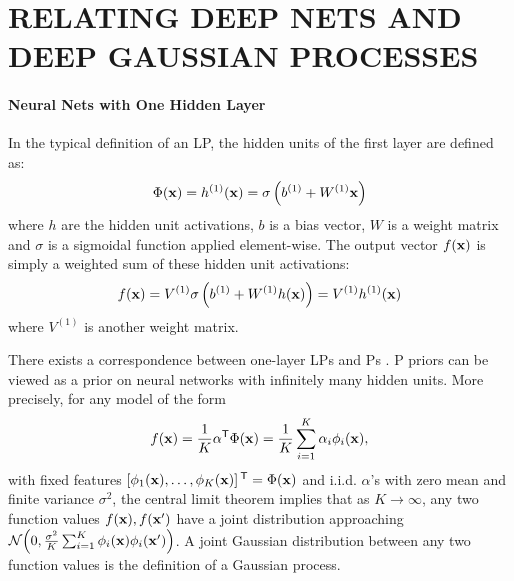 \documentclass[twoside]{article}
\makeatletter
\newlength{\nonHumbleHeight}
\def\@humbleformat#1{{\settoheight{\nonHumbleHeight}{#1}\resizebox{!}{0.94\nonHumbleHeight}{#1}}}%
\def\humble#1{\@humbleformat{#1}}%
\newcommand{\gp}{{\humble GP}}
\newcommand{\MLP}{{\humble MLP}}
\newcommand{\sectiondist}{}
\makeatother
\begin{document}
\section{RELATING DEEP NETS AND DEEP GAUSSIAN PROCESSES}
\label{sec:relating}
\sectiondist


\paragraph{Neural Nets with One Hidden Layer}
In the typical definition of an \MLP{}, the hidden units of the first layer are defined as:
%
\begin{align}
\Phi({\bf{x}}) = h^{(1)}({\bf{x}}) = \sigma \left( b^{(1)} + W^{(1)}{\bf{x}} \right)
\end{align}
%
where $h$ are the hidden unit activations, $b$ is a bias vector, $W$ is a weight matrix and $\sigma$ is a sigmoidal function applied element-wise. The output vector $f({\bf{x}})$ is simply a weighted sum of these hidden unit activations:
%
\begin{align}
f({\bf{x}}) = V^{(1)} \sigma \left( b^{(1)} + W^{(1)} h({\bf{x}}) \right)  = V^{(1)} h^{(1)}({\bf{x}}) 
\end{align}
%
where $V^{(1)}$ is another weight matrix.

There exists a correspondence between one-layer \MLP{}s and \gp{}s \citep{neal1995bayesian}.  \gp{} priors can be viewed as a prior on neural networks with infinitely many hidden units.  More precisely, for any model of the form
%
\begin{align}
f({\bf{x}}) = \frac{1}{K}{\mathbf \alpha}{^\mathsf{T}} \Phi({\bf{x}}) = \frac{1}{K} \sum_{i=1}^K \alpha_i \phi_i({\bf{x}}),
\label{eq:one-layer-nn}
\end{align}
%
with fixed features $\left[ \phi_1({\bf{x}}), \dots, \phi_K({\bf{x}}) \right]{^\ensuremath{\mathsf{T}}} = \Phi({\bf{x}})$ and i.i.d. $\alpha$'s with zero mean and finite variance $\sigma^2$, the central limit theorem implies that as $K \rightarrow \infty$, any two function values $f({\bf{x}}), f({\bf{x}}')$ have a joint distribution approaching $\mathcal{N}\!\left(0,\frac{\sigma^2}{K}\sum_{i=1}^K \phi_i({\bf{x}})\phi_i({\bf{x}}')\right)$.  A joint Gaussian distribution between any two function values is the definition of a Gaussian process.
\end{document}
